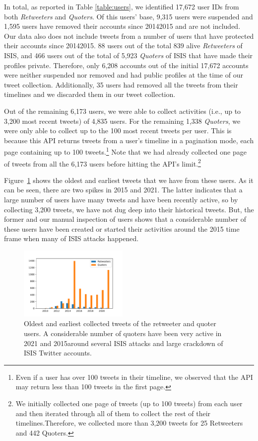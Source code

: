\documentclass[letterpaper]{article} %
\begin{document}
In total, as reported in Table \ref{table:users}, we identified  17,672 user IDs from both \textit{Retweeters} and \textit{Quoters}. Of this users' base,  9,315 users were  suspended and 1,595 users have removed their accounts since 20142015 and are not included. Our data  also does not include  tweets from  a  number of   users that have protected their accounts since 20142015.  88 users out of the total 839 alive \textit{Retweeters} of ISIS, and 466 users out of the total of 5,923 \textit{Quoters} of ISIS that have made their profiles private. Therefore, only 6,208 accounts out of the initial 17,672 accounts were neither suspended nor removed and had public profiles at the time of our tweet collection. Additionally, 35 users had removed all the tweets from their timelines and we discarded them in our tweet collection.

Out of the remaining 6,173 users, we were able to collect  activities (i.e., up to 3,200 most recent tweets) of 4,835 users. For the remaining 1,338 \textit{Quoters}, we were only able to collect up to the 100 most recent tweets per user. This is because this API returns tweets from a user's timeline in a pagination mode, each page containing up to 100 tweets.\footnote{Even if a user has over 100 tweets in their timeline, we observed that the API may return less than 100 tweets in the first page.}  Note that we had already collected one page of tweets from all the 6,173 users before hitting the API's limit.\footnote{We initially collected one page of tweets (up to 100 tweets) from each user and then iterated through all of them to collect the rest of their timelines.Therefore, we collected more than 3,200  tweets for 25 Retweeters and 442 Quoters.} 

Figure~\ref{fig:first-activity} shows the oldest and earliest tweets that we have from these users. As it can be seen, there are two spikes in 2015 and 2021. The latter indicates that a large number of users have many tweets and have been recently active, so by collecting 3,200 tweets, we have not dug deep into their historical tweets. But, the former and our manual inspection of users shows that a considerable number of these users have been created or started their activities around the 2015 time frame when many of ISIS attacks happened.

\begin{figure}[ht]
\includegraphics[width=0.47\textwidth]{img/earliest-activity.pdf}
\caption{Oldest and earliest collected tweets of the retweeter and quoter users. A considerable number of quoters have been very active in 2021 and 2015around several ISIS attacks and large crackdown of ISIS Twitter accounts.}
\label{fig:first-activity}
\end{figure}
\end{document}
